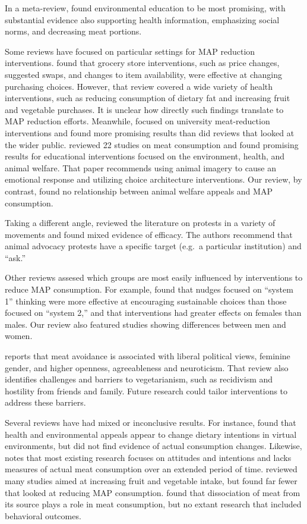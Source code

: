 \documentclass[sn-nature,referee,pdflatex]{sn-jnl}
\begin{document}
In a meta-review, \citep{grundy2022} found environmental education to be
most promising, with substantial evidence also supporting health
information, emphasizing social norms, and decreasing meat portions.

Some reviews have focused on particular settings for MAP reduction
interventions. \citep{hartmannboyce2018} found that grocery store
interventions, such as price changes, suggested swaps, and changes to
item availability, were effective at changing purchasing choices.
However, that review covered a wide variety of health interventions,
such as reducing consumption of dietary fat and increasing fruit and
vegetable purchases. It is unclear how directly such findings translate
to MAP reduction efforts. Meanwhile, \citep{chang2023} focused on
university meat-reduction interventions and found more promising results
than did reviews that looked at the wider public. \citep{harguess2020}
reviewed 22 studies on meat consumption and found promising results for
educational interventions focused on the environment, health, and animal
welfare. That paper recommends using animal imagery to cause an
emotional response and utilizing choice architecture interventions. Our
review, by contrast, found no relationship between animal welfare
appeals and MAP consumption.

Taking a different angle, \citep{adleberg2018} reviewed the literature
on protests in a variety of movements and found mixed evidence of
efficacy. The authors recommend that animal advocacy protests have a
specific target (e.g.~a particular institution) and ``ask.''

Other reviews assesed which groups are most easily influenced by
interventions to reduce MAP consumption. For example,
\citep{blackford2021} found that nudges focused on ``system 1'' thinking
were more effective at encouraging sustainable choices than those
focused on ``system 2,'' and that interventions had greater effects on
females than males. Our review also featured studies showing differences
between men and women.

\citep{rosenfeld2018} reports that meat avoidance is associated with
liberal political views, feminine gender, and higher openness,
agreeableness and neuroticism. That review also identifies challenges
and barriers to vegetarianism, such as recidivism and hostility from
friends and family. Future research could tailor interventions to
address these barriers.

Several reviews have had mixed or inconclusive results. For instance,
\citep{bianchi2018conscious} found that health and environmental appeals
appear to change dietary intentions in virtual environments, but did not
find evidence of actual consumption changes. Likewise,
\citep{kwasny2022} notes that most existing research focuses on
attitudes and intentions and lacks measures of actual meat consumption
over an extended period of time. \citep{taufik2019} reviewed many
studies aimed at increasing fruit and vegetable intake, but found far
fewer that looked at reducing MAP consumption. \citep{benningstad2020}
found that dissociation of meat from its source plays a role in meat
consumption, but no extant research that included behavioral outcomes.
\end{document}
